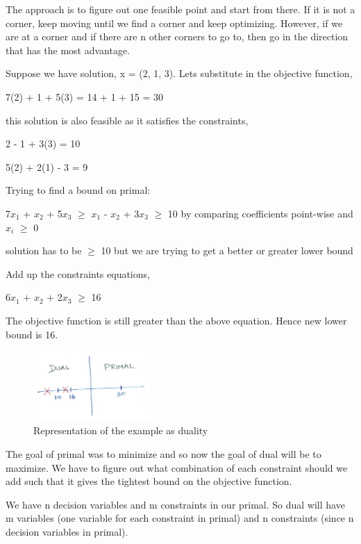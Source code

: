 \documentclass[twoside]{article}
\begin{document}
The approach is to figure out one feasible point and start from there. If it is not a corner, keep moving until we find a corner and keep optimizing. However, if we are at a corner and if there are n other corners to go to, then go in the direction that has the most advantage.

Suppose we have solution, x = (2, 1, 3). Lets substitute in the objective function,

\hspace{10mm} 7(2) + 1 + 5(3) = 14 + 1 + 15 = 30

this solution is also feasible as it satisfies the constraints,

\hspace{10mm} 2 - 1 + 3(3) = 10 

\hspace{10mm} 5(2) + 2(1) - 3 = 9

Trying to find a bound on primal:

\hspace{10mm} 7$x_1$ + $x_2$ + 5$x_3$ $\geq$ $x_1$ - $x_2$ + 3$x_3$ $\geq$ 10
by comparing coefficients point-wise and $x_i$ $\geq$ 0

solution has to be $\geq$ 10 but we are trying to get a better or greater lower bound

Add up the constraints equations,

\hspace{10mm} 6$x_1$ + $x_2$ + 2$x_3$ $\geq$ 16

The objective function is still greater than the above equation. Hence new lower bound is 16.
\begin{figure}[h]
    \centering
    \includegraphics[width=0.4\textwidth]{Primal-Dual.png}
    \caption{Representation of the example as duality}
    \label{fig:lp2}
\end{figure}

The goal of primal was to minimize and so now the goal of dual will be to maximize. We have to figure out what combination of each constraint should we add such that it gives the tightest bound on the objective function.

We have n decision variables and m constraints in our primal. So dual will have m variables (one variable for each constraint in primal) and n constraints (since n decision variables in primal).
\end{document}
